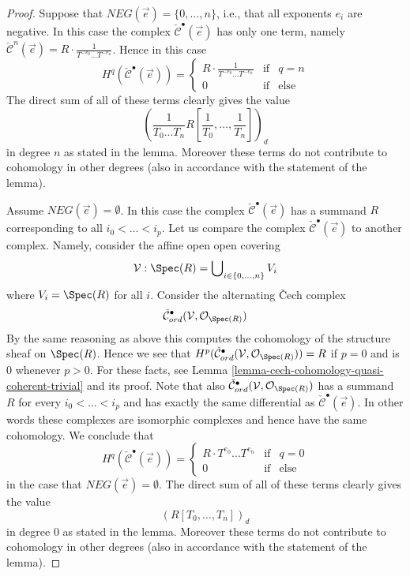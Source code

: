 \begin{proof}
\medskip\noindent
Suppose that $NEG(\vec{e}) = \{0, \ldots, n\}$, i.e., that all
exponents $e_i$ are negative.
In this case the complex $\check{\mathcal{C}}^\bullet(\vec{e})$ has
only one term, namely $\check{\mathcal{C}}^n(\vec{e}) =
R \cdot \frac{1}{T^{-e_0} \ldots T^{-e_n}}$. Hence in this
case
$$
H^q(\check{\mathcal{C}}^\bullet(\vec{e})) =
\left\{
\begin{matrix}
R \cdot \frac{1}{T^{-e_0} \ldots T^{-e_n}} & \text{if} & q = n \\
0 & \text{if} & \text{else}
\end{matrix}
\right.
$$
The direct sum of all of these terms clearly gives the value
$$
\left(\frac{1}{T_0 \ldots T_n} R[\frac{1}{T_0}, \ldots, \frac{1}{T_n}]\right)_d
$$
in degree $n$ as stated in the lemma. Moreover these terms do not contribute
to cohomology in other degrees (also in accordance with the statement of the
lemma).

\medskip\noindent
Assume $NEG(\vec{e}) = \emptyset$. In this case the complex
$\check{\mathcal{C}}^\bullet(\vec{e})$ has a summand $R$ corresponding
to all $i_0 < \ldots < i_p$.
Let us compare the complex $\check{\mathcal{C}}^\bullet(\vec{e})$
to another complex. Namely, consider the affine open open covering
$$
\mathcal{V} : \Spec(R) = \bigcup\nolimits_{i \in \{0, \ldots, n\}} V_i
$$
where $V_i = \Spec(R)$ for all $i$. Consider the alternating
{\v C}ech complex
$$
\check{\mathcal{C}}_{ord}^\bullet(\mathcal{V}, \mathcal{O}_{\Spec(R)})
$$
By the same reasoning as above this computes the cohomology of the
structure sheaf on $\Spec(R)$. Hence we see that
$H^p(
\check{\mathcal{C}}_{ord}^\bullet(\mathcal{V}, \mathcal{O}_{\Spec(R)})
) = R$ if $p = 0$ and is $0$ whenever $p > 0$.
For these facts, see
Lemma \ref{lemma-cech-cohomology-quasi-coherent-trivial} and its proof.
Note that also
$\check{\mathcal{C}}_{ord}^\bullet(\mathcal{V}, \mathcal{O}_{\Spec(R)})$
has a summand $R$ for every $i_0 < \ldots < i_p$ and has exactly the same
differential as $\check{\mathcal{C}}^\bullet(\vec{e})$. In other words
these complexes are isomorphic complexes and hence have the same cohomology.
We conclude that
$$
H^q(\check{\mathcal{C}}^\bullet(\vec{e})) =
\left\{
\begin{matrix}
R \cdot T^{e_0} \ldots T^{e_n} & \text{if} & q = 0 \\
0 & \text{if} & \text{else}
\end{matrix}
\right.
$$
in the case that $NEG(\vec{e}) = \emptyset$.
The direct sum of all of these terms clearly gives the value
$$
(R[T_0, \ldots, T_n])_d
$$
in degree $0$ as stated in the lemma. Moreover these terms do not contribute
to cohomology in other degrees (also in accordance with the statement of the
lemma).


\end{proof}
